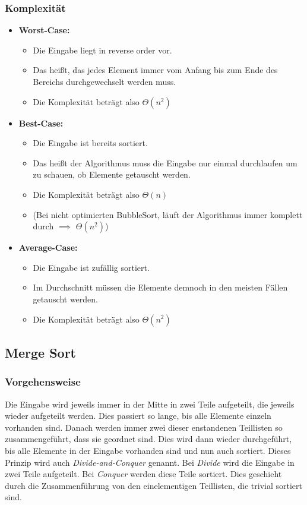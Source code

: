 \documentclass[
../../AuD-Zusammenfassung.tex,
]
{subfiles}
\begin{document}
\subsubsection{Komplexität}
\begin{itemize}
    \item \textbf{Worst-Case:}
    \begin{itemize}
        \item Die Eingabe liegt in reverse order vor. 
        \item Das heißt, das jedes Element immer vom Anfang bis zum Ende des Bereichs durchgewechselt werden muss.
        \item Die Komplexität beträgt also $\Theta(n^2)$
    \end{itemize}
    \item \textbf{Best-Case:}
    \begin{itemize}
        \item Die Eingabe ist bereits sortiert.
        \item Das heißt der Algorithmus muss die Eingabe nur einmal durchlaufen um zu schauen, ob Elemente getauscht werden.
        \item Die Komplexität beträgt also $\Theta(n)$
        \item (Bei nicht optimierten BubbleSort, läuft der Algorithmus immer komplett durch $\implies$ $\Theta(n^2)$)
    \end{itemize}
    \item \textbf{Average-Case:}
    \begin{itemize}
        \item Die Eingabe ist zufällig sortiert.
        \item Im Durchschnitt müssen die Elemente demnoch in den meisten Fällen getauscht werden.
        \item Die Komplexität beträgt also $\Theta(n^2)$
    \end{itemize}
\end{itemize}
\newpage
\subsection{Merge Sort}

\subsubsection{Vorgehensweise}
Die Eingabe wird jeweils immer in der Mitte in zwei Teile aufgeteilt, die jeweils wieder aufgeteilt werden. Dies passiert so lange, bis alle Elemente einzeln vorhanden sind. Danach werden immer zwei dieser enstandenen Teillisten so zusammengeführt, dass sie geordnet sind. Dies wird dann wieder durchgeführt, bis alle Elemente in der Eingabe vorhanden sind und nun auch sortiert.
Dieses Prinzip wird auch \textit{Divide-and-Conquer} genannt. Bei \textit{Divide} wird die Eingabe in zwei Teile aufgeteilt. Bei \textit{Conquer} werden diese Teile sortiert. Dies geschieht durch die Zusammenführung von den einelementigen Teillisten, die trivial sortiert sind.
\newpage
\end{document}
